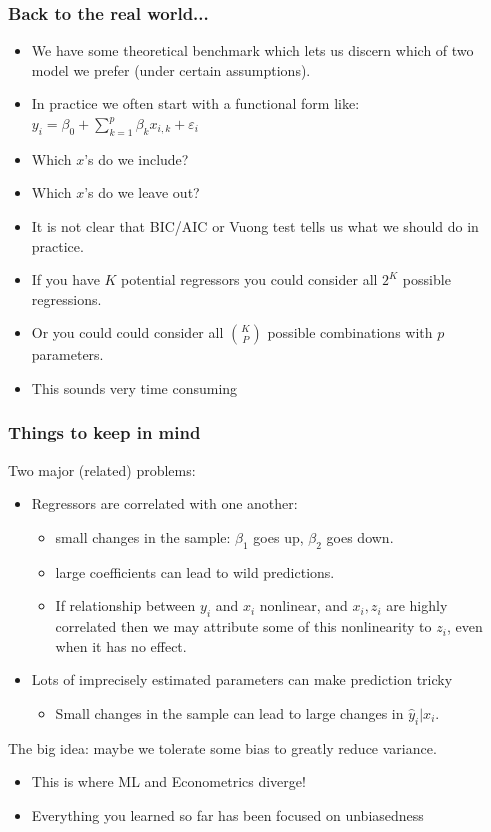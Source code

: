\documentclass[xcolor=pdftex,dvipsnames,table,mathserif,aspectratio=169]{beamer}
\begin{document}
\begin{frame}
\frametitle{Back to the real world...}
\begin{itemize}
\item We have some theoretical benchmark which lets us discern which of two model we prefer (under certain assumptions).
\item In practice we often start with a functional form like:\\
 $y_i = \beta_0 + \sum_{k=1}^p \beta_k x_{i,k} + \varepsilon_{i}$
 \item Which $x$'s do we include?
 \item Which $x$'s do we leave out?
 \item It is not clear that BIC/AIC or Vuong test tells us what we should do in practice.
 \item If you have $K$ potential regressors you could consider all $2^K$ possible regressions.
 \item Or you could could consider all $K \choose P$ possible combinations with $p$ parameters.
 \item This sounds very time consuming
\end{itemize}
\end{frame}


\begin{frame}
\frametitle{Things to keep in mind}
Two major (related) problems:
\begin{itemize}
\item Regressors are correlated with one another:
\begin{itemize}
\item small changes in the sample: $\beta_1$ goes up, $\beta_2$ goes down. 
\item large coefficients can lead to wild predictions.
\item If relationship between $y_i$ and $x_i$ nonlinear, and $x_i,z_i$ are highly correlated then we may attribute some of this nonlinearity to $z_i$, even when it has no effect.
\end{itemize}
\item Lots of imprecisely estimated parameters can make prediction tricky
\begin{itemize}
\item Small changes in the sample can lead to large changes in $\hat{y}_i | x_i$.
\end{itemize}
\end{itemize}
The big idea: maybe we tolerate some \alert{bias} to greatly reduce \alert{variance}.
\begin{itemize}
\item This is where ML and Econometrics diverge!
\item Everything you learned so far has been focused on \alert{unbiasedness}
\end{itemize}
\end{frame}
\end{document}
